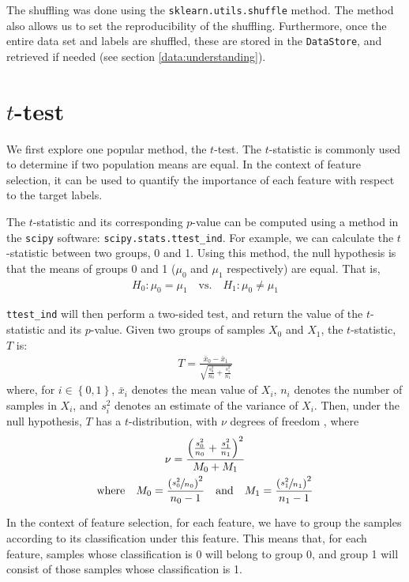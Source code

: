 \documentclass[12pt, twoside, a4paper]{report}
\begin{document}
The shuffling was done using the \texttt{sklearn.utils.shuffle} method. The method also allows us to set the reproducibility of the shuffling. Furthermore, once the entire data set and labels are shuffled, these are stored in the \texttt{DataStore}, and retrieved if needed (see section \ref{data:understanding}).


\section{$t$-test} \label{t-test}

We first explore one popular method, the $t$-test. The $t$-statistic is commonly used to determine if two population means are equal. In the context of feature selection, it can be used to quantify the importance of each feature with respect to the target labels.

The $t$-statistic and its corresponding $p$-value can be computed using a method in the \texttt{scipy} \cite{scipy} software: \texttt{scipy.stats.ttest\_ind}. For example, we can calculate the $t$-statistic between two groups, 0 and 1. Using this method, the null hypothesis is that the means of groups 0 and 1 ($\mu_0$ and $\mu_1$ respectively) are equal. That is,
\begin{align*}
H_0: \mu_0 = \mu_1 \quad \text{vs.} \quad H_1: \mu_0 \neq \mu_1
\end{align*}

\texttt{ttest\_ind} will then perform a two-sided test, and return the value of the $t$-statistic and its $p$-value. Given two groups of samples $X_0$ and $X_1$, the $t$-statistic, $T$ is:
\begin{align*}
T = \frac{\bar{x}_0 - \bar{x}_1}{\sqrt{\frac{s_0^2}{n_0} + \frac{s_1^2}{n_1}}}
\end{align*}
where, for $i \in \left\lbrace 0,1 \right\rbrace$, $\bar{x}_i$ denotes the mean value of $X_i$, $n_i$ denotes the number of samples in $X_i$, and $s_i^2$ denotes an estimate of the variance of $X_i$. Then, under the null hypothesis, $T$ has a $t$-distribution, with $\nu$ degrees of freedom \cite{RefWorks:219}, where
\begin{gather*}
\nu = \frac{\left( \frac{s_0^2}{n_0} + \frac{s_1^2}{n_1} \right)^2}{ M_0 + M_1 } \\
\text{where} \quad M_0 = \frac{\left(\sfrac{s_0^2}{n_0}\right)^2}{n_0-1} \quad \text{and} \quad
M_1 = \frac{\left(\sfrac{s_1^2}{n_1}\right)^2}{n_1-1}
\end{gather*}

In the context of feature selection, for each feature, we have to group the samples according to its classification under this feature. This means that, for each feature, samples whose classification is 0 will belong to group 0, and group 1 will consist of those samples whose classification is 1.
\end{document}
